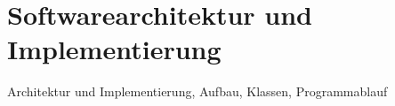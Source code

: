 \chapter{Softwarearchitektur und Implementierung}

Architektur und Implementierung, Aufbau, Klassen, Programmablauf

